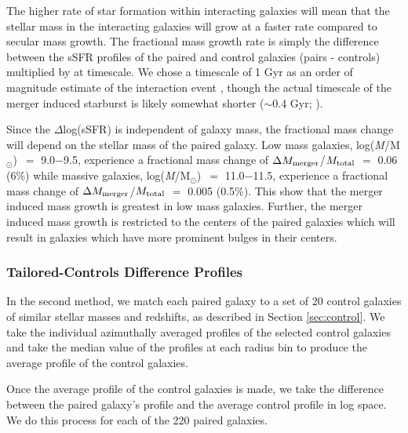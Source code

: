 \documentclass[iop,revtex4,twocolumn,apj,numberedappendix,appendixfloats]{emulateapj}
\newcommand{\logm}{log({\it M}/M$_{\odot}$)}
\begin{document}
The higher rate of star formation within interacting galaxies will mean that the stellar mass in the interacting galaxies will grow at a faster rate compared to secular mass growth. The fractional mass growth rate is simply the difference between the sSFR profiles of the paired and control galaxies (pairs - controls) multiplied by at timescale. We chose a timescale of 1 Gyr as an order of magnitude estimate of the interaction event \citep{Boylan-Kolchin:2008}, though the actual timescale of the merger induced starburst is likely somewhat shorter ($\sim$0.4 Gyr; \citet{Feng:2019}). 

Since the $\Delta$log(sSFR) is independent of galaxy mass, the fractional mass change will depend on the stellar mass of the paired galaxy. Low mass galaxies, \logm\ $=$ 9.0$-$9.5, experience a fractional mass change of $\Delta M_{\rm merger}$/$M_{\rm total}$ $=$ 0.06 (6\%) while massive galaxies, \logm\ $=$ 11.0$-$11.5, experience a fractional mass change of $\Delta M_{\rm merger}$/$M_{\rm total}$ $=$ 0.005 (0.5\%). This show that the merger induced mass growth is greatest in low mass galaxies. Further, the merger induced mass growth is restricted to the centers of the paired galaxies which will result in galaxies which have more prominent bulges in their centers. 

\subsubsection{Tailored-Controls Difference Profiles}\label{sec:tailored}

In the second method, we match each paired galaxy to a set of 20 control galaxies of similar stellar masses and redshifts, as described in Section \ref{sec:control}. We take the individual azimuthally averaged profiles of the selected control galaxies and take the median value of the profiles at each radius bin to produce the average profile of the control galaxies. 


Once the average profile of the control galaxies is made, we take the difference between the paired galaxy's profile and the average control profile in log space. We do this process for each of the 220 paired galaxies. 
\end{document}
